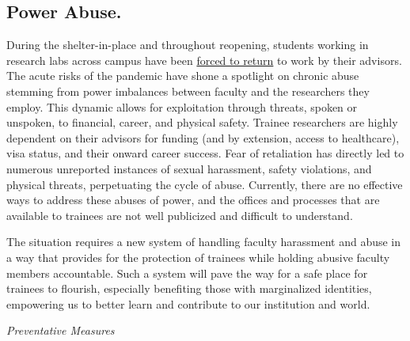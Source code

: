 \documentclass[12pt, titlepage, letterpaper]{article}
\begin{document}
\subsection*{Power Abuse.}
%

During the shelter-in-place and throughout reopening, students working in research labs across campus have been \href{https://www.stanforddaily.com/2020/03/25/publish-and-perish-despite-shelter-in-place-grad-students-cite-pressure-to-continue-lab-work/}{forced to return} to work by their advisors. The acute risks of the pandemic have shone a spotlight on chronic abuse stemming from power imbalances between faculty and the researchers they employ. This dynamic allows for exploitation through threats, spoken or unspoken, to financial, career, and physical safety. Trainee researchers are highly dependent on their advisors for funding (and by extension, access to healthcare), visa status, and their onward career success. Fear of retaliation has directly led to numerous unreported instances of sexual harassment, safety violations, and physical threats, perpetuating the cycle of abuse. Currently, there are no effective ways to address these abuses of power, and the offices and processes that are available to trainees are not well publicized and difficult to understand. 

The situation requires a new system of handling faculty harassment and abuse in a way that provides for the protection of trainees while holding abusive faculty members accountable. Such a system will pave the way for a safe place for trainees to flourish, especially benefiting those with marginalized identities, empowering us to better learn and contribute to our institution and world.


\textit{Preventative Measures
}
\end{document}
